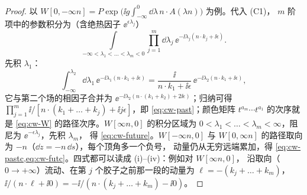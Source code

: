 \begin{proof}
以 $W[0,-\infty n]=P\exp\big(\ii g\int_{-\infty}^0\dd\lambda\,n\cdot A(\lambda n)\big)$ 为例。代入 (C1)，
$m$ 阶项中的参数积分为（含绝热因子 $\ee^{\epsilon\lambda_j}$）
\[
\int\limits_{-\infty<\lambda_1<\dots<\lambda_m<0}\prod_{j=1}^m\dd\lambda_j\,\ee^{-\ii\lambda_j(n\cdot k_j+\ii\epsilon)} .
\]
先积 $\lambda_1$：
\[
\int_{-\infty}^{\lambda_2}\dd\lambda_1\,\ee^{-\ii\lambda_1(n\cdot k_1+\ii\epsilon)}=\frac{\ii}{n\cdot k_1+\ii\epsilon}\,\ee^{-\ii\lambda_2(n\cdot k_1+\ii\epsilon)},
\]
它与第二个场的相因子合并为 $\ee^{-\ii\lambda_2(n\cdot(k_1+k_2)+2\ii\epsilon)}$；归纳可得
$\prod_{j=1}^m\ii/[n\cdot(k_1+\dots+k_j)+\ii j\epsilon]$，即 \cref{eq:cw-past}；颜色矩阵 $t^{a_m}\cdots t^{a_1}$ 的次序就是 \cref{eq:cw-W}
的路径次序。$W[\infty n,0]$ 的积分区域为 $0<\lambda_1<\dots<\lambda_m<\infty$，阻尼为 $\ee^{-\epsilon\lambda_j}$，先积 $\lambda_m$，
得 \cref{eq:cw-future}。$W[-\infty n,0]$ 与 $W[0,\infty n]$ 的路径取向为 $-n$（$\dd z=-n\,\dd s$），每个顶角多一个负号，
动量仍从无穷远端累加，得 \cref{eq:cw-pastc,eq:cw-futc}。四式都可以读成 (i)–(iv)：例如对 $W[\infty n,0]$，
沿取向（$0\to+\infty$）流动、在第 $j$ 个胶子之前那一段的动量为 $\ell=-(k_j+\dots+k_m)$，
$\ii/(n\cdot\ell+\ii0)=-\ii/(n\cdot(k_j+\dots+k_m)-\ii0)$。
\end{proof}

